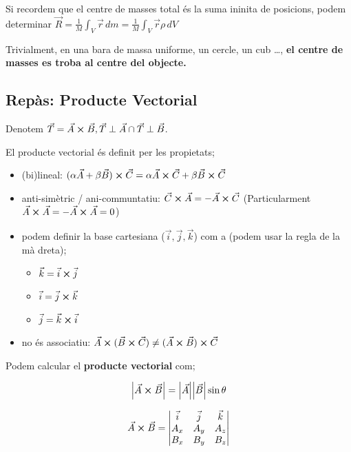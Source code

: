 \documentclass[12pt]{article}
\begin{document}
Si recordem que el centre de masses total és la suma ininita de posicions, podem determinar $\vec{R} = \frac{1}{M}\int_V \vec{r} \, dm = \frac{1}{M}\int_V \vec{r}\rho \, dV$

Trivialment, en una bara de massa uniforme, un cercle, un cub \dots, \textbf{el centre de masses es troba al centre del objecte.}

\subsection{Repàs: Producte Vectorial}

Denotem $\vec{T} = \vec{A} \cross \vec{B}, \vec{T} \perp \vec{A} \cap \vec{T} \perp \vec{B}$.

El producte vectorial és definit per les propietats;

\begin{itemize}
    \item (bi)lineal: $(\alpha\vec{A} + \beta\vec{B}) \cross \vec{C} = \alpha \vec{A} \cross \vec{C} + \beta \vec{B} \cross \vec{C}$
    \item anti-simètric / ani-communtatiu: $\vec{C} \cross \vec{A} = - \vec{A} \cross \vec{C}$ (Particularment $\vec{A} \cross \vec{A}= - \vec{A} \cross \vec{A} = 0$)
    \item podem definir la base cartesiana ($\vec{i}, \vec{j}, \vec{k}$) com a (podem usar la regla de la mà dreta);
        \begin{itemize}
            \item $\vec{k} = \vec{i} \cross \vec{j}$
            \item $\vec{i} = \vec{j} \cross \vec{k}$
            \item $\vec{j} = \vec{k} \cross \vec{i}$
        \end{itemize}
    \item no és associatiu: $\vec{A}\cross (\vec{B}\cross \vec{C}) \neq (\vec{A} \cross \vec{B})\cross \vec{C}$
\end{itemize}

Podem calcular el \textbf{producte vectorial} com;

\[\abs{\vec{A} \cross \vec{B}} = \abs{\vec{A}} \abs{\vec{B}} \sin\theta\]

\[\vec{A} \cross \vec{B} = \begin{vmatrix}
    \vec{i} & \vec{j} & \vec{k} \\
    A_x & A_y & A_z\\
    B_x & B_y & B_z
\end{vmatrix}\]
\end{document}
